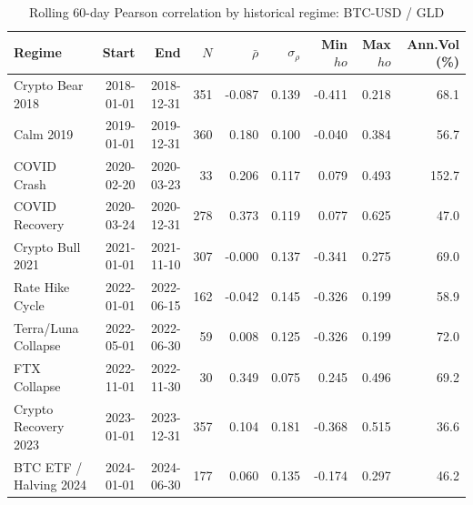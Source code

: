 \begin{table}[H]
\centering
\small
\caption{Rolling 60-day Pearson correlation by historical regime: BTC-USD / GLD}
\label{tab:regime_corr_BTCUSDGLD}
\begin{tabular}{lrrrrrrrr}
\toprule
Regime & Start & End & $N$ & $\bar{\rho}$ & $\sigma_\rho$ & Min $
ho$ & Max $
ho$ & Ann.Vol (\%) \\
\midrule
Crypto Bear 2018 & 2018-01-01 & 2018-12-31 & 351 & -0.087 & 0.139 & -0.411 & 0.218 & 68.1 \\
Calm 2019 & 2019-01-01 & 2019-12-31 & 360 & 0.180 & 0.100 & -0.040 & 0.384 & 56.7 \\
COVID Crash & 2020-02-20 & 2020-03-23 & 33 & 0.206 & 0.117 & 0.079 & 0.493 & 152.7 \\
COVID Recovery & 2020-03-24 & 2020-12-31 & 278 & 0.373 & 0.119 & 0.077 & 0.625 & 47.0 \\
Crypto Bull 2021 & 2021-01-01 & 2021-11-10 & 307 & -0.000 & 0.137 & -0.341 & 0.275 & 69.0 \\
Rate Hike Cycle & 2022-01-01 & 2022-06-15 & 162 & -0.042 & 0.145 & -0.326 & 0.199 & 58.9 \\
Terra/Luna Collapse & 2022-05-01 & 2022-06-30 & 59 & 0.008 & 0.125 & -0.326 & 0.199 & 72.0 \\
FTX Collapse & 2022-11-01 & 2022-11-30 & 30 & 0.349 & 0.075 & 0.245 & 0.496 & 69.2 \\
Crypto Recovery 2023 & 2023-01-01 & 2023-12-31 & 357 & 0.104 & 0.181 & -0.368 & 0.515 & 36.6 \\
BTC ETF / Halving 2024 & 2024-01-01 & 2024-06-30 & 177 & 0.060 & 0.135 & -0.174 & 0.297 & 46.2 \\
\bottomrule
\end{tabular}
\end{table}